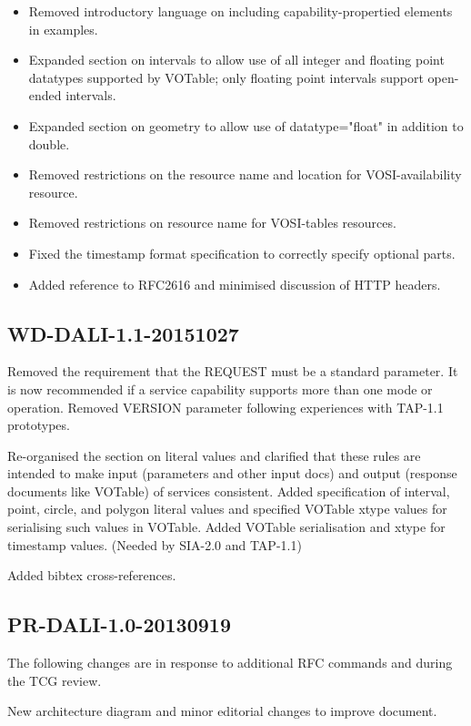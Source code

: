 \documentclass[11pt,letter]{ivoa}
\begin{document}
\begin{itemize}
\item Removed introductory language on including capability-propertied elements in
examples.
\item Expanded section on intervals to allow use of all integer and floating point datatypes 
supported by VOTable; only floating point intervals support open-ended intervals.
\item Expanded section on geometry to allow use of datatype="float" in addition to double.
\item Removed restrictions on the resource name and location for VOSI-availability resource.
\item Removed restrictions on resource name for VOSI-tables resources.
\item Fixed the timestamp format specification to correctly specify optional parts.
\item Added reference to RFC2616 and minimised discussion of HTTP headers.
\end{itemize}

\subsection{WD-DALI-1.1-20151027}

Removed the requirement that the REQUEST must be a standard parameter. It is 
now recommended if a service capability supports more than one mode or 
operation. Removed VERSION parameter following experiences with TAP-1.1 
prototypes.

Re-organised the section on literal values and clarified that these rules 
are intended to make input (parameters and other input docs) and output 
(response documents like VOTable) of services consistent. Added specification 
of interval, point, circle, and polygon literal values and specified VOTable 
xtype values for serialising such values in VOTable. Added VOTable serialisation 
and xtype for timestamp values. (Needed by SIA-2.0 and TAP-1.1)

Added bibtex cross-references.

\subsection{PR-DALI-1.0-20130919}
The following changes are in response to additional RFC commands and during the 
TCG review.

New architecture diagram and minor editorial changes to improve document.
\end{document}
